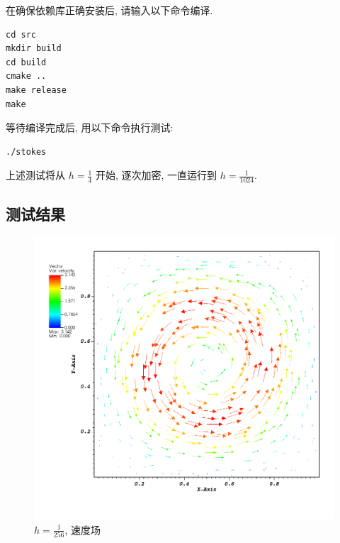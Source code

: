 \documentclass[lang=cn,11pt,a4paper]{elegantpaper}
\begin{document}
在确保依赖库正确安装后, 请输入以下命令编译. 
\begin{lstlisting}
cd src
mkdir build
cd build
cmake ..
make release
make
\end{lstlisting}
等待编译完成后, 用以下命令执行测试: 
\begin{lstlisting}
./stokes
\end{lstlisting}
上述测试将从 $h=\frac{1}{4}$ 开始, 逐次加密, 
一直运行到 $h=\frac{1}{1024}$. 

\subsection{测试结果}

\begin{figure}[H]
    \centering
    \begin{minipage}[t]{0.32\textwidth}
        \centering
        \includegraphics[width=\linewidth]{fig/velocity.png}
        \caption{\small $h=\frac{1}{256}$, 速度场}
    \end{minipage}
    \hfill
    \begin{minipage}[t]{0.32\textwidth}
        \centering

\end{minipage}
\end{figure}
\end{document}

